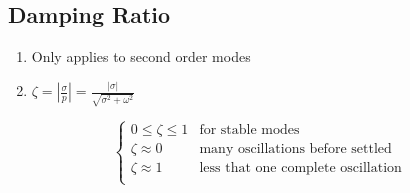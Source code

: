 \subsection*{Damping Ratio}
\begin{enumerate}
    \item Only applies to second order modes
    \item \( \zeta = \left|\frac{\sigma}{p}\right| = \frac{|\sigma|}{\sqrt{\sigma^2+\omega^2}} \)
\end{enumerate}
\[
    \begin{cases}
        0 \leq \zeta \leq 1 & \text{for stable modes} \\
        \zeta \approx 0 & \text{many oscillations before settled} \\
        \zeta \approx 1 & \text{less that one complete oscillation} \\
    \end{cases}
\]